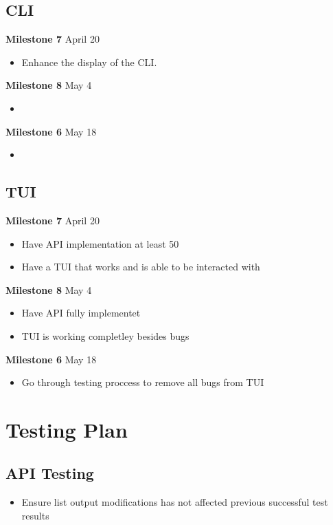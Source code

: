 \documentclass[11pt]{article}
\begin{document}
\subsection*{CLI}
\textbf{Milestone 7} April 20
\begin{itemize}
  \item Enhance the display of the CLI. 
\end{itemize}
\textbf{Milestone 8} May 4
\begin{itemize}
  \item
\end{itemize}
\textbf{Milestone 6} May 18
\begin{itemize}
  \item
\end{itemize}

\subsection*{TUI}
\textbf{Milestone 7} April 20
\begin{itemize}
  \item Have API implementation at least 50%
  \item Have a TUI that works and is able to be interacted with 
\end{itemize}
\textbf{Milestone 8} May 4
\begin{itemize}
  \item Have API fully implementet
  \item TUI is working completley besides bugs
\end{itemize}
\textbf{Milestone 6} May 18
\begin{itemize}
  \item Go through testing proccess to remove all bugs from TUI
\end{itemize}

\section*{Testing Plan}

\subsection*{API Testing}
\begin{itemize}
  \item Ensure list output modifications has not affected previous 
    successful test results
\end{itemize}
\end{document}
